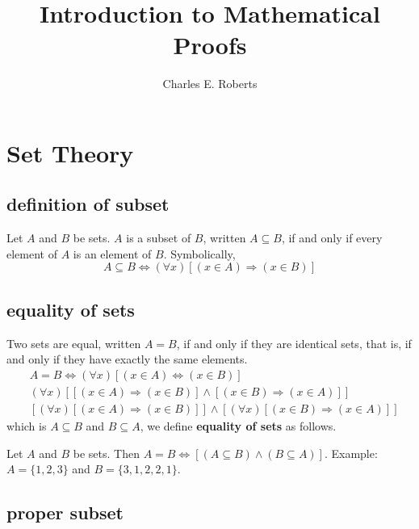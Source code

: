 \documentclass{article}
\begin{document}
    \title{Introduction to Mathematical Proofs}
    \author{Charles E. Roberts}
    \maketitle

    \tableofcontents

    \section{Set Theory}

    \subsection{definition of subset}

    Let $A$ and $B$ be sets. $A$ is a subset of $B$, written $A \subseteq B$, if and only if every element of $A$ is an element of $B$. Symbolically,
    \begin{equation}
    A \subseteq B \Leftrightarrow (\forall x)[(x \in A) \Rightarrow (x \in B)]
    \end{equation}

    \subsection{equality of sets}
    
    Two sets are equal, written $A = B$, if and only if they are identical sets, that is, if and only if they have exactly the same elements.
    \begin{equation}
    \begin{aligned}
    & A = B \Leftrightarrow (\forall x)[(x \in A) \Leftrightarrow (x \in B)] \\
    & (\forall x)[[(x \in A) \Rightarrow (x \in B)] \wedge [(x \in B) \Rightarrow (x \in A)]] \\
    & [(\forall x)[(x \in A) \Rightarrow (x \in B)]] \wedge [(\forall x)[(x \in B) \Rightarrow (x \in A)]]
    \end{aligned}
    \end{equation}
    which is $A \subseteq B$ and $B \subseteq A$, we define \textbf{equality of sets} as follows.
   
    Let $A$ and $B$ be sets. Then $A = B \Leftrightarrow [(A \subseteq B) \wedge (B \subseteq A)]$. Example: $A = \{1,2,3\}$ and $B = \{3,1,2,2,1\}$.

    \subsection{proper subset}
\end{document}
